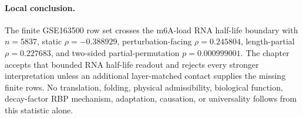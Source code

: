 \paragraph{Local conclusion.}
The finite GSE163500 row set crosses the m6A-load RNA half-life boundary with $n=5837$, static $\rho=-0.388929$, perturbation-facing $\rho=0.245804$, length-partial $\rho=0.227683$, and two-sided partial-permutation $p=0.000999001$. The chapter accepts that bounded RNA half-life readout and rejects every stronger interpretation unless an additional layer-matched contact supplies the missing finite rows. No translation, folding, physical admissibility, biological function, decay-factor RBP mechanism, adaptation, causation, or universality follows from this statistic alone.